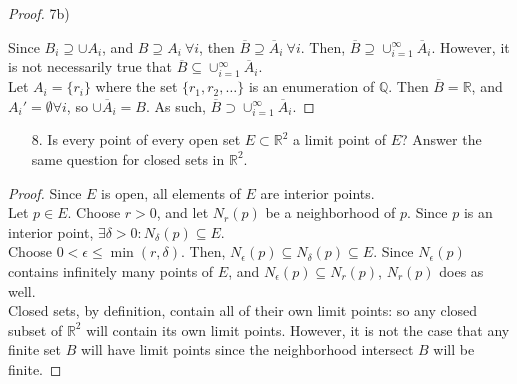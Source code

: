\documentclass[10pt]{article}
\theoremstyle{definition}
\theoremstyle{plain}
\newcommand{\Q}{\mathbb{Q}}
\newcommand{\R}{\mathbb{R}}
\begin{document}
\begin{proof}
7b)

Since $B_i \supseteq \cup A_i$, and $B \supseteq A_i\ \forall i$, then $\overline{B} \supseteq \overline{A}_i\ \forall i$. Then, $\overline{B} \supseteq \cup^{\infty}_{i=1} \overline{A}_i$. However, it is not necessarily true that $\overline{B} \subseteq \cup^{\infty}_{i=1} \overline{A}_i$. \\

Let $A_i = \{r_i\}$ where the set $\{r_1, r_2, \dots\}$ is an enumeration of $\Q$. Then $\overline{B} = \R$, and $A_i' = \emptyset \forall i$, so $\cup \overline{A}_i = B$. As such, $\overline{B} \supset \cup^{\infty}_{i=1} \overline{A}_i$.
\end{proof}


\pagebreak



\begin{enumerate}
\item[8.] Is every point of every open set $E \subset \R^2$ a limit point of $E$? Answer the same question for closed sets in $\R^2$.
\end{enumerate}

\begin{proof}
Since $E$ is open, all elements of $E$ are interior points. \\

Let $p\in E$. Choose $r>0$, and let $N_r(p)$ be a neighborhood of $p$. Since $p$ is an interior point, $\exists \delta > 0: N_\delta (p) \subseteq E$. \\

Choose $0<\epsilon \leq \min(r,\delta)$. Then, $N_\epsilon (p) \subseteq N_\delta (p) \subseteq E$. Since $N_\epsilon (p)$ contains infinitely many points of $E$, and $N_\epsilon (p) \subseteq N_r (p)$, $N_r(p)$ does as well. \\

Closed sets, by definition, contain all of their own limit points: so any closed subset of $\R^2$ will contain its own limit points. However, it is not the case that any finite set $B$ will have limit points since the neighborhood intersect $B$ will be finite.
\end{proof}




\pagebreak
\end{document}
